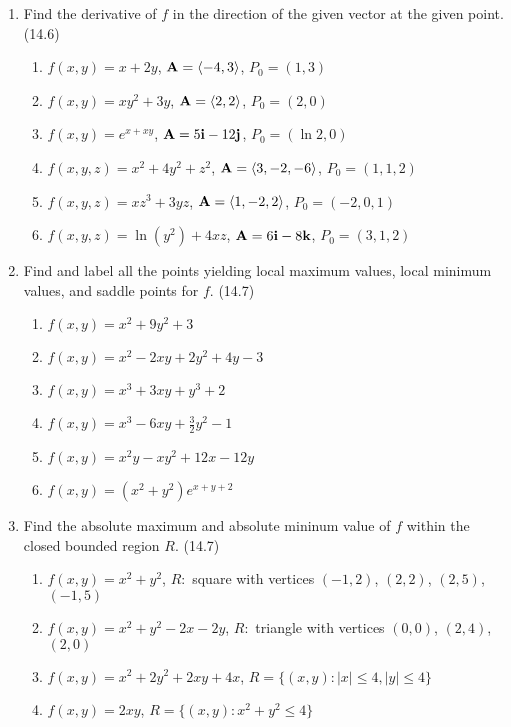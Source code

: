 \begin{enumerate}
    \newpage

    \item Find the derivative of $f$ in the direction of the given vector at the given point. (14.6)

      \begin{enumerate}
        \item $f(x,y)=x+2y$, $\mathbf{A}=\left<-4,3\right>$, $P_0=(1,3)$
        \item $f(x,y)=xy^2+3y$, $\mathbf{A}=\left<2,2\right>$, $P_0=(2,0)$
        \item $f(x,y)=e^{x+xy}$, $\mathbf{A}=5\mathbf{i}-12\mathbf{j}$, $P_0=(\ln 2,0)$
        \item $f(x,y,z)=x^2+4y^2+z^2$, $\mathbf{A}=\left<3,-2,-6\right>$, $P_0=(1,1,2)$
        \item $f(x,y,z)=xz^3+3yz$, $\mathbf{A}=\left<1,-2,2\right>$, $P_0=(-2,0,1)$
        \item $f(x,y,z)=\ln(y^2)+4xz$, $\mathbf{A}=6\mathbf{i}-8\mathbf{k}$, $P_0=(3,1,2)$
      \end{enumerate}

    \item Find and label all the points yielding local maximum values, local minimum values, and saddle points for $f$. (14.7)

      \begin{enumerate}
        \item $f(x,y)=x^2+9y^2+3$
        \item $f(x,y)=x^2-2xy+2y^2+4y-3$
        \item $f(x,y)=x^3+3xy+y^3+2$
        \item $f(x,y)=x^3-6xy+\frac{3}{2}y^2-1$
        \item $f(x,y)=x^2y-xy^2+12x-12y$
        \item $f(x,y)=(x^2+y^2)e^{x+y+2}$
      \end{enumerate}

    \item Find the absolute maximum and absolute mininum value of $f$ within the closed bounded region $R$. (14.7)

      \begin{enumerate}
        \item $f(x,y)=x^2+y^2$, $R:$ square with vertices $(-1,2)$, $(2,2)$, $(2,5)$, $(-1,5)$
        \item $f(x,y)=x^2+y^2-2x-2y$, $R:$ triangle with vertices $(0,0)$, $(2,4)$, $(2,0)$
        \item $f(x,y)=x^2+2y^2+2xy+4x$, $R = \{(x,y):|x|\leq4,|y|\leq4\}$
        \item $f(x,y)=2xy$, $R = \{(x,y):x^2+y^2\leq 4\}$
      \end{enumerate}


\end{enumerate}
